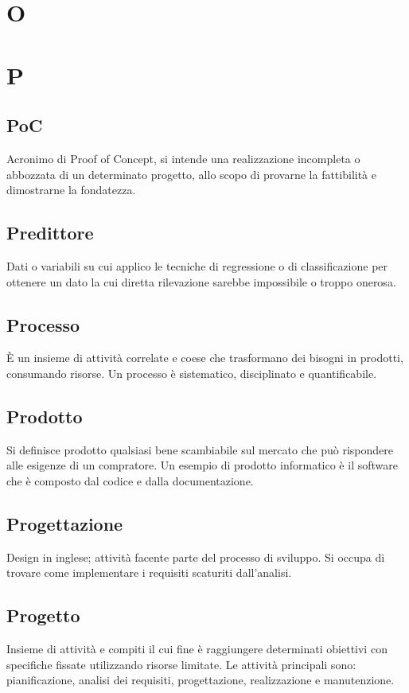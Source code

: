 \clearpage
\section*{O}

\clearpage
\section*{P}

\subsection*{PoC}
Acronimo di Proof of Concept, si intende una realizzazione incompleta o abbozzata di un determinato progetto, allo scopo di provarne la fattibilità e dimostrarne la fondatezza.

\subsection*{Predittore}
Dati o variabili su cui applico le tecniche di regressione o di classificazione per ottenere un dato la cui diretta rilevazione sarebbe impossibile o troppo onerosa.

\subsection*{Processo}
È un insieme di attività correlate e coese che trasformano dei bisogni in prodotti, consumando risorse. Un processo è sistematico, disciplinato e quantificabile.

\subsection*{Prodotto}
Si definisce prodotto qualsiasi bene scambiabile sul mercato che può rispondere alle esigenze di un compratore. Un esempio di prodotto informatico è il software che è composto dal codice e dalla documentazione.

\subsection*{Progettazione}
Design in inglese; attività facente parte del processo di sviluppo. Si occupa di trovare come implementare i requisiti scaturiti dall'analisi.

\subsection*{Progetto}
Insieme di attività e compiti il cui fine è raggiungere determinati obiettivi con specifiche fissate utilizzando risorse limitate. Le attività principali sono: pianificazione, analisi dei requisiti, progettazione, realizzazione e manutenzione.

